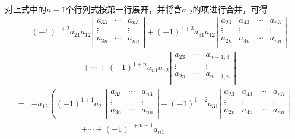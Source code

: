 \begin{frame}
    对上式中的$n-1$个行列式按第一行展开，并将含$a_{12}$的项进行合并，可得
    $$
    \begin{aligned}
      & (-1)^{1+2}a_{21} a_{12}
      \left|
        \begin{array}{ccc}       
          a_{33} & \cdots & a_{n3} \\
          \vdots  & & \vdots \\
          a_{3n} & \cdots & a_{nn} \\
        \end{array}
      \right| 
      + (-1)^{1+3}a_{31} a_{12}
      \left|
        \begin{array}{cccc}
          a_{23}  & a_{43} & \cdots & a_{n3} \\
          \vdots & \vdots & & \vdots \\
          a_{2n}  & a_{4n} & \cdots & a_{nn} \\
        \end{array}
      \right|  \\
      & \hspace{1in} + \cdots +(-1)^{1+n} a_{n1} a_{12}
      \left|
        \begin{array}{ccc}
          a_{23} & \cdots & a_{n-1,3} \\
          \vdots & & \vdots \\
          a_{2n} & \cdots & a_{n-1,n} \\
        \end{array}
      \right|\\
      = &   -a_{12} \left(
        (-1)^{1+1} a_{21} 
        \left|
          \begin{array}{ccc}       
            a_{33} & \cdots & a_{n3} \\
            \vdots  & & \vdots \\
            a_{3n} & \cdots & a_{nn} \\
          \end{array}
        \right|    
        + (-1)^{1+2}a_{31} 
        \left|
          \begin{array}{cccc}
            a_{23}  & a_{43} & \cdots & a_{n3} \\
            \vdots & \vdots & & \vdots \\
            a_{2n}  & a_{4n} & \cdots & a_{nn} \\
          \end{array}
        \right|\right.\\
      &  \hspace{1in} \left. + \cdots + (-1)^{1+n-1} a_{n1}

\end{aligned}$$
\end{frame}
